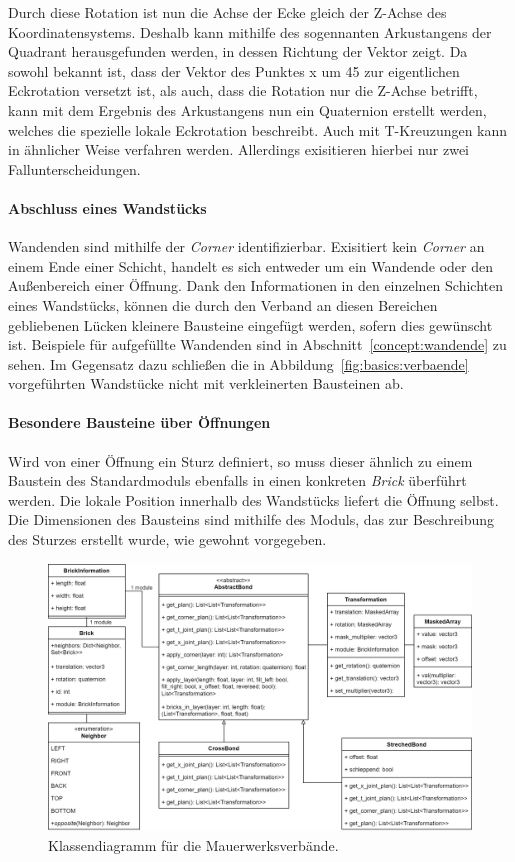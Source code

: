 Durch diese Rotation ist nun die Achse der Ecke gleich der Z-Achse des Koordinatensystems.
Deshalb kann mithilfe des sogennanten Arkustangens der Quadrant herausgefunden werden, in dessen Richtung der Vektor zeigt.
Da sowohl bekannt ist, dass der Vektor des Punktes x um 45\degree{} zur eigentlichen Eckrotation versetzt ist, als auch, dass die Rotation nur die Z-Achse betrifft, kann mit dem Ergebnis des Arkustangens nun ein Quaternion erstellt werden, welches die spezielle lokale Eckrotation beschreibt.
Auch mit T-Kreuzungen kann in ähnlicher Weise verfahren werden. 
Allerdings exisitieren hierbei nur zwei Fallunterscheidungen.

\paragraph*{Abschluss eines Wandstücks} Wandenden sind mithilfe der \textit{Corner} identifizierbar.
Exisitiert kein \textit{Corner} an einem Ende einer Schicht, handelt es sich entweder um ein Wandende oder den Außenbereich einer Öffnung.
Dank den Informationen in den einzelnen Schichten eines Wandstücks, können die durch den Verband an diesen Bereichen gebliebenen Lücken kleinere Bausteine eingefügt werden, sofern dies gewünscht ist.
Beispiele für aufgefüllte Wandenden sind in Abschnitt~\ref{concept:wandende} zu sehen.
Im Gegensatz dazu schließen die in Abbildung~\ref{fig:basics:verbaende} vorgeführten Wandstücke nicht mit verkleinerten Bausteinen ab.

\paragraph*{Besondere Bausteine über Öffnungen} Wird von einer Öffnung ein Sturz definiert, so muss dieser ähnlich zu einem Baustein des Standardmoduls ebenfalls in einen konkreten \textit{Brick} überführt werden.
Die lokale Position innerhalb des Wandstücks liefert die Öffnung selbst.
Die Dimensionen des Bausteins sind mithilfe des Moduls, das zur Beschreibung des Sturzes erstellt wurde, wie gewohnt vorgegeben.

\begin{figure}[hb]
  \centering
  \includegraphics[width=0.9\columnwidth]{fig/klassendiagramm_bonds.drawio.png}
  \caption{Klassendiagramm für die Mauerwerksverbände.}
  \label{fig:real:class_diagram_bonds}
\end{figure}

